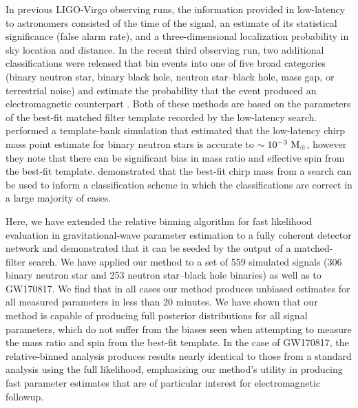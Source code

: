 In previous LIGO-Virgo observing runs, the information provided in low-latency to astronomers consisted of the time of the signal, an estimate of its statistical significance (false alarm rate), and a three-dimensional localization probability in sky location and distance. In the recent third observing run, two additional classifications were released that bin events into one of five broad categories (binary neutron star, binary black hole, neutron star--black hole, mass gap, or terrestrial noise) and estimate the probability that the event produced an electromagnetic counterpart \cite{Kapadia:2019uut,canton2020realtime}. Both of these methods are based on the parameters of the best-fit matched filter template recorded by the low-latency search. \cite{Biscoveanu_2019} performed a template-bank simulation that estimated that the low-latency chirp mass point estimate for binary neutron stars is accurate to $\sim 10^{-3}~\mathrm{M}_{\odot}$, however they note that there can be significant bias in mass ratio and effective spin from the best-fit template. \cite{canton2020realtime} demonstrated that the best-fit chirp mass from a search can be used to inform a classification scheme in which the classifications are correct in a large majority of cases.

Here, we have extended the relative binning algorithm \cite{cornish2013fast,Zackay:2018qdy} for fast likelihood evaluation in gravitational-wave parameter estimation to a fully coherent detector network and demonstrated that it can be seeded by the output of a matched-filter search. We have applied our method to a set of 559 simulated signals (306 binary neutron star and 253 neutron star--black hole binaries) as well as to GW170817. We find that in all cases our method produces unbiased estimates for all measured parameters in less than 20 minutes. We have shown that our method is capable of producing full posterior distributions for all signal parameters, which do not suffer from the biases seen when attempting to measure the mass ratio and spin from the best-fit template. In the  case of GW170817, the relative-binned analysis produces results nearly identical to those from a standard analysis using the full likelihood, emphasizing our method's utility in producing fast parameter estimates that are of particular interest for electromagnetic followup.

